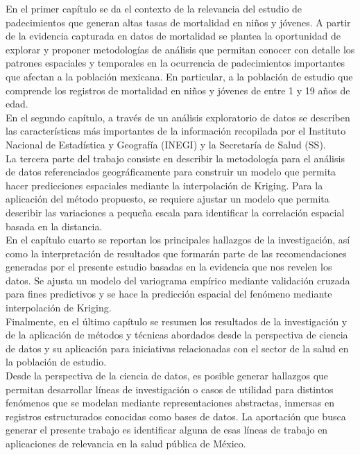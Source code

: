 \documentclass[11pt, oneside]{book}
\begin{document}
En el primer capítulo se da el contexto de la relevancia del estudio de padecimientos que generan altas tasas de mortalidad en niños y jóvenes. A partir de la evidencia capturada en datos de mortalidad se plantea la oportunidad de explorar y proponer metodologías de análisis que permitan conocer con detalle los patrones espaciales y temporales en la ocurrencia de padecimientos importantes que afectan a la población mexicana. En particular, a la población de estudio que comprende los registros de mortalidad en niños y jóvenes de entre 1 y 19 años de edad.\\
  
En el segundo capítulo, a través de un análisis exploratorio de datos se describen las características más importantes de la información recopilada por el Instituto Nacional de Estadística y Geografía (INEGI) y la Secretaría de Salud (SS).\\
  
La tercera parte del trabajo consiste en describir la metodología para el análisis de datos referenciados geográficamente para construir un modelo que permita hacer predicciones espaciales mediante la interpolación de Kriging. Para la aplicación del método propuesto, se requiere ajustar un modelo que permita describir las variaciones a pequeña escala para identificar la correlación espacial basada en la distancia.\\

En el capítulo cuarto se reportan los principales hallazgos de la investigación, así como la interpretación de resultados que formarán parte de las recomendaciones generadas por el presente estudio basadas en la evidencia que nos revelen los datos.  Se ajusta un modelo del variograma empírico mediante validación cruzada para fines predictivos y se hace la predicción espacial del fenómeno mediante interpolación de Kriging.\\
  
Finalmente, en el último capítulo se resumen los resultados de la investigación y de la aplicación de métodos y técnicas abordados desde la perspectiva de ciencia de datos y su aplicación para iniciativas relacionadas con el sector de la salud en la población de estudio.\\

Desde la perspectiva de la ciencia de datos, es posible generar hallazgos que permitan desarrollar líneas de investigación o casos de utilidad para distintos fenómenos que se modelan mediante representaciones abstractas, inmersas en registros estructurados conocidas como bases de datos. La aportación que busca generar el presente trabajo es identificar alguna de esas líneas de trabajo en aplicaciones de relevancia en la salud pública de México.\\ 
\end{document}
